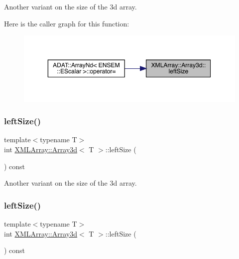 Another variant on the size of the 3d array. 

Here is the caller graph for this function\+:
\nopagebreak
\begin{figure}[H]
\begin{center}
\leavevmode
\includegraphics[width=350pt]{db/da0/classXMLArray_1_1Array3d_a22b8137d2675f4e8f27d475abb217b7a_icgraph}
\end{center}
\end{figure}
\mbox{\label{classXMLArray_1_1Array3d_a22b8137d2675f4e8f27d475abb217b7a}} 
\subsubsection{\texorpdfstring{leftSize()}{leftSize()}\hspace{0.1cm}{\footnotesize\ttfamily [2/3]}}
{\footnotesize\ttfamily template$<$typename T$>$ \\
int \mbox{\hyperlink{classXMLArray_1_1Array3d}{X\+M\+L\+Array\+::\+Array3d}}$<$ T $>$\+::left\+Size (\begin{DoxyParamCaption}{ }\end{DoxyParamCaption}) const\hspace{0.3cm}{\ttfamily [inline]}}



Another variant on the size of the 3d array. 

\mbox{\label{classXMLArray_1_1Array3d_a22b8137d2675f4e8f27d475abb217b7a}} 
\subsubsection{\texorpdfstring{leftSize()}{leftSize()}\hspace{0.1cm}{\footnotesize\ttfamily [3/3]}}
{\footnotesize\ttfamily template$<$typename T$>$ \\
int \mbox{\hyperlink{classXMLArray_1_1Array3d}{X\+M\+L\+Array\+::\+Array3d}}$<$ T $>$\+::left\+Size (\begin{DoxyParamCaption}{ }\end{DoxyParamCaption}) const\hspace{0.3cm}{\ttfamily [inline]}}



